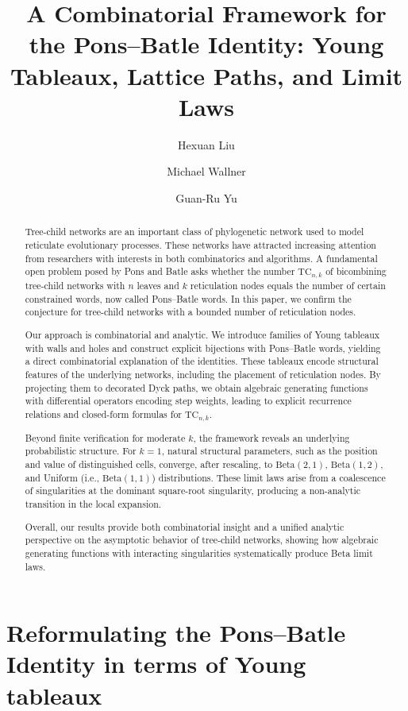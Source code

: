 \documentclass[a4paper,UKenglish,cleveref, autoref, thm-restate]{lipics-v2021}
\title{A Combinatorial Framework for the Pons--Batle Identity: Young Tableaux, Lattice Paths, and Limit Laws}
\author{Hexuan Liu}{Department of Pure and Applied Mathematics, Waseda University, Japan  \and \url{https://researchmap.jp/HexuanLiu?lang=en} }{lhx@ruri.waseda.jp}{https://orcid.org/0009-0001-0388-6041}{Supported by JSPS KAKENHI Grant Number JP25KJ2168 and JST SPRING Grant Number JPMJSP2128}
\author{Michael Wallner}{Institute of Discrete Mathematics, TU Graz, Austria \and Institute of Discrete Mathematics and Geometry, TU Wien, Austria \and \url{https://dmg.tuwien.ac.at/mwallner/} }{michael.wallner@tuwien.ac.at}{https://orcid.org/0000-0001-8581-449X}{Partially supported by the Austrian Science Fund (FWF) P~34142 and AST1535024.}
\author{Guan-Ru Yu}{Department of Applied Mathematics, National Sun Yat-sen University, Taiwan  \and \url{https://sites.google.com/site/guanruyu0127/} }{gryu@math.nsysu.edu.tw}{https://orcid.org/0000-0003-4255-6974}{NSTC-113-2115-M-110-004-MY3 (National Science and Technology Council, Taiwan)}
\newcommand{\TC}{\mathrm{TC}}
\begin{document}
\maketitle

\begin{abstract}
Tree-child networks are an important class of phylogenetic network used to model reticulate evolutionary processes. These networks have attracted increasing attention from researchers with interests in both combinatorics and algorithms. A fundamental open problem posed by Pons and Batle asks whether the number $\TC_{n,k}$ of bicombining tree-child networks with $n$ leaves and $k$ reticulation nodes equals the number of certain constrained words, now called Pons--Batle words. In this paper, we confirm the conjecture for tree-child networks with a bounded number of reticulation nodes.

Our approach is combinatorial and analytic. We introduce families of Young tableaux with walls and holes and construct explicit bijections with Pons--Batle words, yielding a direct combinatorial explanation of the identities. These tableaux encode structural features of the underlying networks, including the placement of reticulation nodes. By projecting them to decorated Dyck paths, we obtain algebraic generating functions with differential operators encoding step weights, leading to explicit recurrence relations and closed-form formulas for $\TC_{n,k}$.

Beyond finite verification for moderate $k$, the framework reveals an underlying probabilistic structure. For $k=1$, natural structural parameters, such as the position and value of distinguished cells, converge, after rescaling, to $\mathrm{Beta}(2,1)$, $\mathrm{Beta}(1,2)$, and Uniform (i.e., $\mathrm{Beta}(1,1)$) distributions. These limit laws arise from a coalescence of singularities at the dominant square-root singularity, producing a non-analytic transition in the local expansion.

Overall, our results provide both combinatorial insight and a unified analytic perspective on the asymptotic behavior of tree-child networks, showing how algebraic generating functions with interacting singularities systematically produce Beta limit laws.

\end{abstract}

\clearpage

\section{Reformulating the Pons--Batle Identity in terms of Young tableaux}
\end{document}
